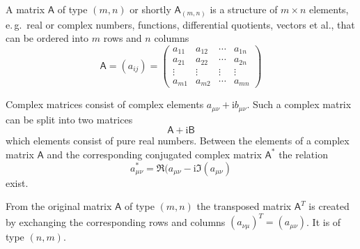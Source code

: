 \documentclass{article}
\newcommand{\mtrx}[1]{\ensuremath{\mathsf{#1}}}
\newcommand{\mi}{\mathrm{i}}
\begin{document}
A matrix \mtrx{A} of type $(m,n)$ or shortly $\mtrx{A}_{(m,n)}$ is a structure
of $m\times n$ elements, e.\,g.\ real or complex numbers, functions,
differential quotients, vectors et al., that can be ordered into $m$ rows
and $n$ columns
\[ \mtrx{A} = (a_{ij}) = \left(\begin{array}{cccc}
     a_{11} & a_{12} & \cdots & a_{1n} \\
     a_{21} & a_{22} & \cdots & a_{2n} \\
     \vdots & \vdots & \vdots & \vdots \\
     a_{m1} & a_{m2} & \cdots & a_{mn}
   \end{array}\right) \]

Complex matrices consist of complex elements $a_{\mu\nu} + \mi b_{\mu\nu}$.
Such a complex matrix can be split into two matrices
\[ \mtrx{A} + \mi\mtrx{B} \]
which elements consist of pure real numbers. Between the elements of a
complex matrix \mtrx{A} and the corresponding conjugated complex matrix
\mtrx{A^*} the relation
\[ a^*_{\mu\nu} = \Re(a_{\mu\nu} - \mi\Im(a_{\mu\nu}) \]
exist.

From the original matrix \mtrx{A} of type $(m,n)$ the transposed matrix
$\mtrx{A}^T$ is created by exchanging the corresponding rows and columns
$(a_{\nu\mu})^T = (a_{\mu\nu})$. It is of type $(n,m)$.
\end{document}
